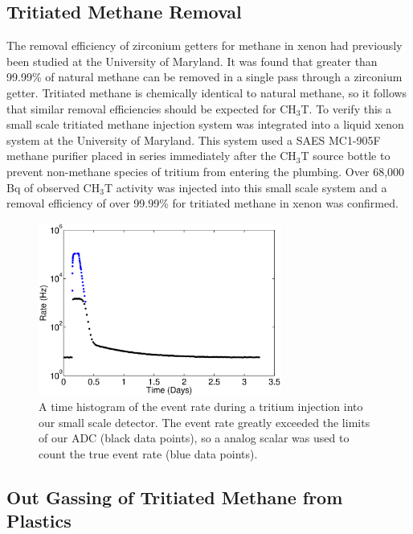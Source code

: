 \subsection{Tritiated Methane Removal}
\label{sec:RD}

The removal efficiency of zirconium getters for methane in xenon had previously been studied at the University of Maryland.  It was found that greater than 99.99\% of natural methane can be removed in a single pass through a zirconium getter. \cite{Dobi_CH4} Tritiated methane is chemically identical to natural methane, so it follows that similar removal efficiencies should be expected for CH$_3$T.  To verify this a small scale tritiated methane injection system was integrated into a liquid xenon system at the University of Maryland.  This system used a SAES MC1-905F methane purifier placed in series immediately after the CH$_3$T source bottle to prevent non-methane species of tritium from entering the plumbing. Over 68,000 Bq of observed CH$_3$T activity was injected into this small scale system and a removal efficiency of over 99.99\% for tritiated methane in xenon was confirmed.

\begin{figure}[h!]\centering
\includegraphics[width=80mm]{TimeHisto_Analog2.eps}
\caption{A time histogram of the event rate during a tritium injection into our small scale detector. The event rate greatly exceeded the limits of our ADC (black data points), so a analog scalar was used to count the true event rate (blue data points). }
\label{fig:Density}
\end{figure}


\subsection{Out Gassing of Tritiated Methane from Plastics}

\newcommand*{\Scale}[2][4]{\scalebox{#1}{$#2$}}%

